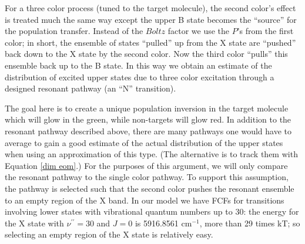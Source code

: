 For a three color process (tuned to the target molecule), the second color's effect is treated much the same way except the upper B state becomes the ``source'' for the population transfer. Instead of the $Boltz$ factor we use the $P$'s from the first color; in short, the ensemble of states ``pulled'' up from the X state are ``pushed'' back down to the X state by the second color. Now the third color ``pulls'' this ensemble back up to the B state. In this way we obtain an estimate of the distribution of excited upper states due to three color excitation through a designed resonant pathway (an ``N'' transition).

The goal here is to create a unique population inversion in the target molecule which will glow in the green, while non-targets will glow red. In addition to the resonant pathway described above, there are many pathways one would have to average to gain a good estimate of the actual distribution of the upper states when using an approximation of this type. (The alternative is to track them with Equation \ref{dim eom}.) For the purposes of this argument, we will only compare the resonant pathway to the single color pathway. To support this assumption, the pathway is selected such that the second color pushes the resonant ensemble to an empty region of the X band. In our model we have FCFs for transitions involving lower states with vibrational quantum numbers up to 30: the energy for the X state with $\nu^{\prime\prime}=30$ and $J=0$ is 5916.8561 cm$^{-1}$, more than 29 times kT; so selecting an empty region of the X state is relatively easy.

